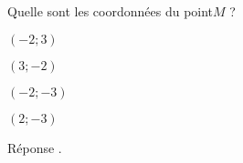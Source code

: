 \begin{exercice}
    Quelle sont les coordonnées du point$M$ ?

    \begin{ChoixQCM}{4}
        \item $(-2;3)$
        \item $(3;-2)$
        \item $(-2;-3)$
        \item $(2;-3)$
    \end{ChoixQCM}
\end{exercice}
\begin{corrige}
    Réponse .
    
\end{corrige}